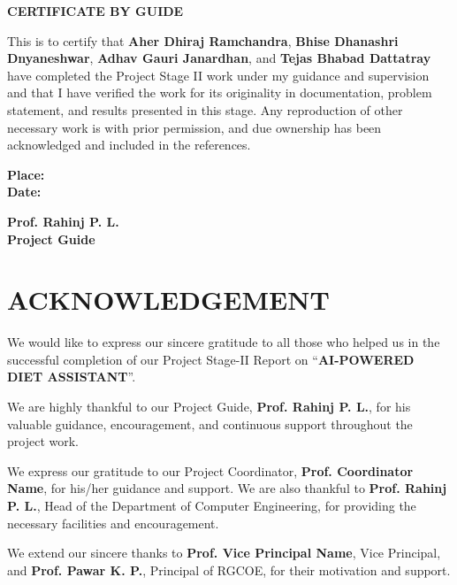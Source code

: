 \documentclass[12pt,a4paper]{report}
\newcommand{\GuideName}{Prof. Rahinj P. L.}
\newcommand{\StudentOne}{Aher Dhiraj Ramchandra}
\newcommand{\StudentTwo}{Bhise Dhanashri Dnyaneshwar}
\newcommand{\StudentThree}{Adhav Gauri Janardhan}
\newcommand{\StudentFour}{Tejas Bhabad Dattatray}
\begin{document}
\newpage
\thispagestyle{plain}
\begin{center}
  {\Large \bfseries CERTIFICATE BY GUIDE}\\[16pt]
\end{center}
\justifying
This is to certify that \textbf{\StudentOne}, \textbf{\StudentTwo}, \textbf{\StudentThree}, and \textbf{\StudentFour} have completed the Project Stage II work under my guidance and supervision and that I have verified the work for its originality in documentation, problem statement, and results presented in this stage. Any reproduction of other necessary work is with prior permission, and due ownership has been acknowledged and included in the references.

\vspace{12pt}
\noindent
\begin{minipage}[t]{0.46\textwidth}
  \textbf{Place:}\\[4pt]
  \textbf{Date:}\\[4pt]
\end{minipage}
\hfill
\begin{minipage}[t]{0.46\textwidth}
  \centering
  \textbf{\GuideName}\\[-2pt]
  \textbf{Project Guide}
\end{minipage}

\newpage
\section*{\centering ACKNOWLEDGEMENT}
\vspace{8mm}
\justifying

We would like to express our sincere gratitude to all those who helped us in the successful completion of our Project Stage-II Report on ``\textbf{AI-POWERED DIET ASSISTANT}''.

We are highly thankful to our Project Guide, \textbf{\GuideName}, for his valuable guidance, encouragement, and continuous support throughout the project work.

We express our gratitude to our Project Coordinator, \textbf{Prof. Coordinator Name}, for his/her guidance and support. We are also thankful to \textbf{Prof. Rahinj P. L.}, Head of the Department of Computer Engineering, for providing the necessary facilities and encouragement.

We extend our sincere thanks to \textbf{Prof. Vice Principal Name}, Vice Principal, and \textbf{Prof. Pawar K. P.}, Principal of RGCOE, for their motivation and support.
\end{document}
